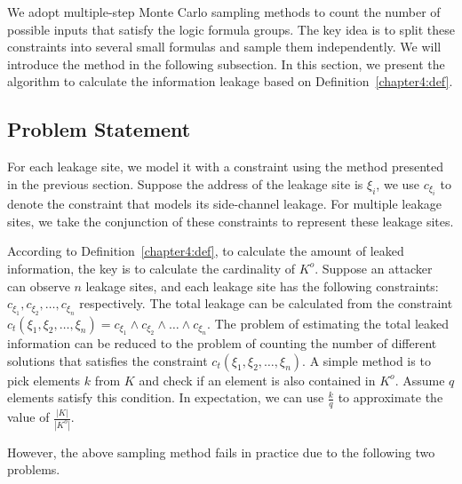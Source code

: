 We adopt multiple-step Monte Carlo sampling methods to count the number of
possible inputs that satisfy the logic formula groups. The key idea is to split
these constraints into several small formulas and sample them independently.
We will introduce the method in the following subsection. In this section, we present the algorithm to calculate the information leakage based on Definition~\ref{chapter4:def}. 


\newcommand{\addr}[1]{{l}_{#1}}
\renewcommand{\addr}[1]{{\gamma}_{#1}}
\renewcommand{\addr}[1]{{\zeta}_{#1}}
\renewcommand{\addr}[1]{{\xi}_{#1}}



\subsection{Problem Statement}
For each leakage site, we model it with a constraint using the
method presented in the previous section. Suppose the address of the leakage site is $\addr{i}$, we use $c_{\addr{i}}$ to denote the constraint that models its side-channel leakage. For multiple leakage sites, we take the conjunction of these constraints to represent these leakage sites.

According to Definition~\ref{chapter4:def}, to calculate the amount of leaked
information, the key is to calculate the cardinality
of $K^o$. Suppose an attacker can observe $n$ leakage sites, and each leakage
site has the following constraints: $c_{\addr{1}}, c_{\addr{2}}, \ldots,
    c_{\addr{n}}$ respectively. The total leakage can be calculated from the constraint
$c_t({\addr{1}},{\addr{2}},\ldots,{\addr{n}}) = c_{\addr{1}} \land c_{\addr{2}}
    \land \ldots \land c_{\addr{n}}$.
The problem of estimating the total leaked
information can be reduced to the problem of counting the number of different
solutions that satisfies the constraint
$c_t({\addr{1}},{\addr{2}},\ldots,{\addr{n}})$.
A simple method is to pick elements $k$ from $K$ and check if an
element is also contained in $K^o$. Assume $q$ elements satisfy this condition. In
expectation, we can use $\frac{k}{q}$ to approximate the value of
$\frac{|K|}{|K^o|}$.

However, the above sampling method fails in practice due to the following two problems.

